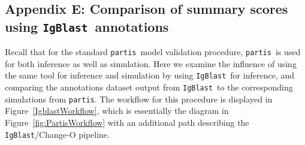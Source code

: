 \documentclass{article}
\newcommand{\partis}{\texttt{partis}}
\newcommand{\igblast}{\texttt{IgBlast}}
\begin{document}
\subsection*{Appendix E: Comparison of summary scores using \igblast\ annotations}
Recall that for the standard \partis\ model validation procedure, \partis\ is used for both inference as well as simulation.
Here we examine the influence of using the same tool for inference and simulation by using \igblast\ for inference, and comparing the annotations dataset output from \igblast\ to the corresponding simulations from \partis.
The workflow for this procedure is displayed in Figure~\ref{IgblastWorkflow}, which is essentially the diagram in Figure~\ref{fig:PartisWorkflow} with an additional path describing the \igblast/Change-O pipeline.
\end{document}
